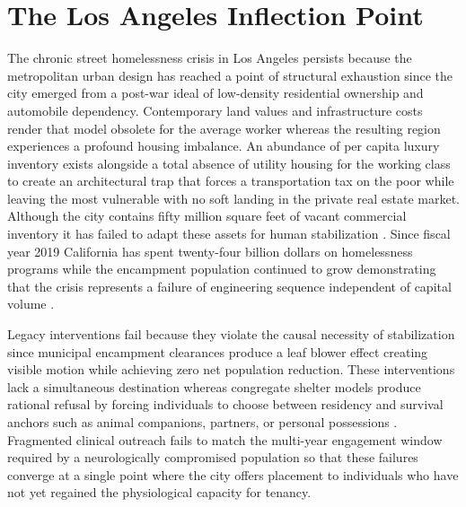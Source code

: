 \documentclass[12pt, letterpaper]{article}
\begin{document}
\newpage
\begingroup
{}
\setlength{\cftbeforesecskip}{2pt}
\setlength{\cftbeforesubsecskip}{-2pt}
\tableofcontents
\endgroup


\clearpage
\section{The Los Angeles Inflection Point}

The chronic street homelessness crisis in Los Angeles persists because the metropolitan urban design has reached a point of structural exhaustion since the city emerged from a post-war ideal of low-density residential ownership and automobile dependency. Contemporary land values and infrastructure costs render that model obsolete for the average worker whereas the resulting region experiences a profound housing imbalance. An abundance of per capita luxury inventory exists alongside a total absence of utility housing for the working class to create an architectural trap that forces a transportation tax on the poor while leaving the most vulnerable with no soft landing in the private real estate market. Although the city contains fifty million square feet of vacant commercial inventory it has failed to adapt these assets for human stabilization \citep{globest_2025}. Since fiscal year 2019 California has spent twenty-four billion dollars on homelessness programs while the encampment population continued to grow demonstrating that the crisis represents a failure of engineering sequence independent of capital volume \citep{ca_24b_expenditure_2026, lahsa_count_2025}.

Legacy interventions fail because they violate the causal necessity of stabilization since municipal encampment clearances produce a leaf blower effect creating visible motion while achieving zero net population reduction. These interventions lack a simultaneous destination whereas congregate shelter models produce rational refusal by forcing individuals to choose between residency and survival anchors such as animal companions, partners, or personal possessions \citep{usda_pet_barriers_2023, hud_shelter_barriers_2022}. Fragmented clinical outreach fails to match the multi-year engagement window required by a neurologically compromised population so that these failures converge at a single point where the city offers placement to individuals who have not yet regained the physiological capacity for tenancy.
\end{document}

